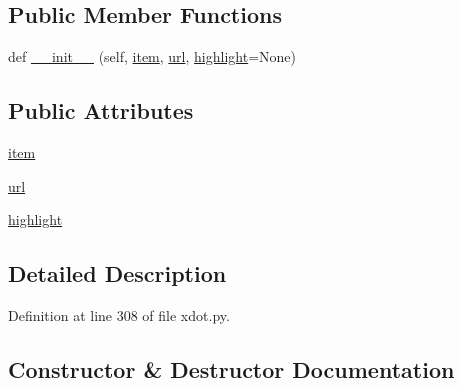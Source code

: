 \subsection*{Public Member Functions}
\begin{DoxyCompactItemize}
\item 
def \hyperlink{classsmacc__viewer_1_1xdot_1_1xdot_1_1Url_a05cf1725f79fb251884e7282c1a1d965}{\+\_\+\+\_\+init\+\_\+\+\_\+} (self, \hyperlink{classsmacc__viewer_1_1xdot_1_1xdot_1_1Url_ad6da3cce0f6c7413f002204ab2a4a836}{item}, \hyperlink{classsmacc__viewer_1_1xdot_1_1xdot_1_1Url_a46f83d8fd310c90f35269c7e5760bdbc}{url}, \hyperlink{classsmacc__viewer_1_1xdot_1_1xdot_1_1Url_af9513b6761a35bbfdb2698e6118b0cb2}{highlight}=None)
\end{DoxyCompactItemize}
\subsection*{Public Attributes}
\begin{DoxyCompactItemize}
\item 
\hyperlink{classsmacc__viewer_1_1xdot_1_1xdot_1_1Url_ad6da3cce0f6c7413f002204ab2a4a836}{item}
\item 
\hyperlink{classsmacc__viewer_1_1xdot_1_1xdot_1_1Url_a46f83d8fd310c90f35269c7e5760bdbc}{url}
\item 
\hyperlink{classsmacc__viewer_1_1xdot_1_1xdot_1_1Url_af9513b6761a35bbfdb2698e6118b0cb2}{highlight}
\end{DoxyCompactItemize}


\subsection{Detailed Description}


Definition at line 308 of file xdot.\+py.



\subsection{Constructor \& Destructor Documentation}
